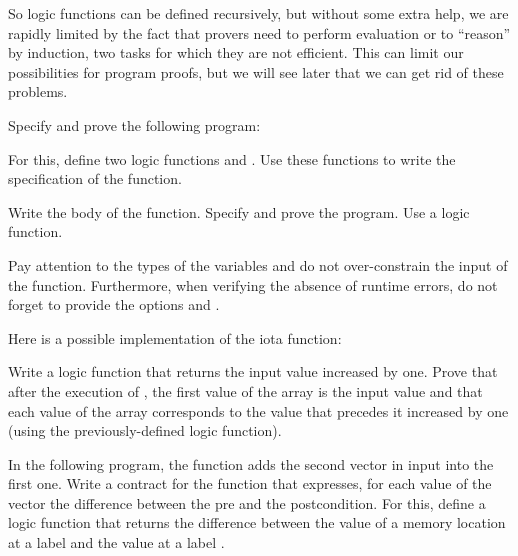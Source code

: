 So logic functions can be defined recursively, but without some extra
help, we are rapidly limited by the fact that provers need to
perform evaluation or to ``reason'' by induction, two tasks for which
they are not efficient. This can limit our possibilities for program
proofs, but we will see later that we can get rid of these problems.







Specify and prove the following program:






For this, define two logic functions  and .
Use these functions to write the specification of the function.






Write the body of the  function. Specify and prove the
program. Use a  logic function.




Pay attention to the types of the variables and do not over-constrain the input of
the function. Furthermore, when verifying the absence of runtime errors, do not
forget to provide the options  and
.






Here is a possible implementation of the iota function:




Write a logic function that returns the input value increased by one. Prove
that after the execution of , the first value of the array is
the input value and that each value of the array corresponds to the value that
precedes it increased by one (using the previously-defined logic function).







In the following program, the  function adds the second
vector in input into the first one. Write a contract for the function
 that expresses, for each value of the vector
 the difference between the pre and the postcondition. For this,
define a logic function  that returns the difference between
the value of a memory location at a label  and the value at a
label .


